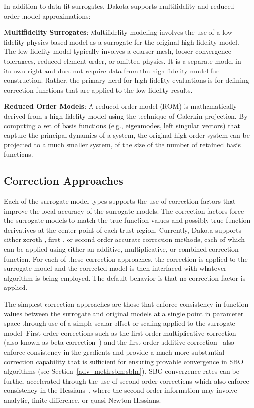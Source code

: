 In addition to data fit surrogates, Dakota supports multifidelity 
and reduced-order model approximations:

\textbf{Multifidelity Surrogates}: Multifidelity modeling involves the
use of a low-fidelity physics-based model as a surrogate for the
original high-fidelity model.  The low-fidelity model typically
involves a coarser mesh, looser convergence tolerances, reduced
element order, or omitted physics.  It is a separate model in its own
right and does not require data from the high-fidelity model for
construction.  Rather, the primary need for high-fidelity evaluations
is for defining correction functions that are applied to the
low-fidelity results.

\textbf{Reduced Order Models}: A reduced-order model (ROM) is
mathematically derived from a high-fidelity model using the technique
of Galerkin projection.  By computing a set of basis functions (e.g.,
eigenmodes, left singular vectors) that capture the principal dynamics
of a system, the original high-order system can be projected to a much
smaller system, of the size of the number of retained basis functions.

\subsection{Correction Approaches}

Each of the surrogate model types supports the use of correction
factors that improve the local accuracy of the surrogate models. The
correction factors force the surrogate models to match the true
function values and possibly true function derivatives at the center
point of each trust region. Currently, Dakota supports either zeroth-,
first-, or second-order accurate correction methods, each of which can
be applied using either an additive, multiplicative, or combined
correction function. For each of these correction approaches, the
correction is applied to the surrogate model and the corrected model
is then interfaced with whatever algorithm is being employed.  The
default behavior is that no correction factor is applied.

The simplest correction approaches are those that enforce consistency
in function values between the surrogate and original models at a
single point in parameter space through use of a simple scalar offset
or scaling applied to the surrogate model.  First-order corrections
such as the first-order multiplicative correction (also known as beta
correction~\cite{Cha93}) and the first-order additive
correction~\cite{Lew00} also enforce consistency in the gradients and
provide a much more substantial correction capability that is
sufficient for ensuring provable convergence in SBO algorithms (see
Section~\ref{adv_meth:sbm:sblm}).  SBO convergence rates can be further
accelerated through the use of second-order corrections which also
enforce consistency in the Hessians~\cite{Eld04}, where the
second-order information may involve analytic, finite-difference, or
quasi-Newton Hessians.

